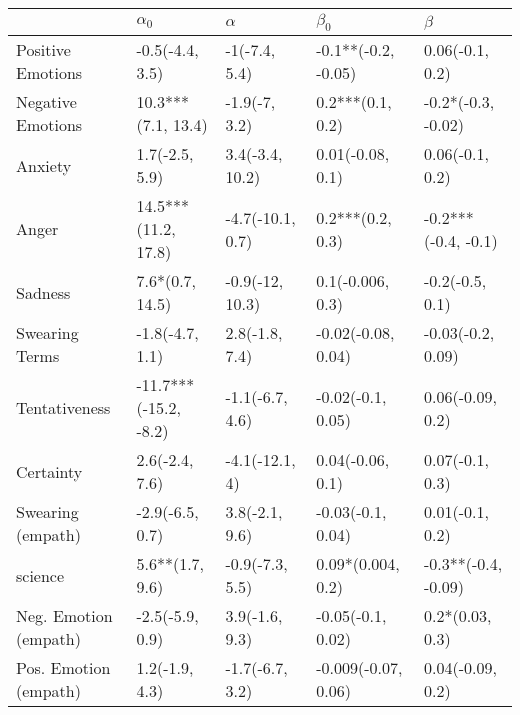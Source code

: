 \begin{tabular}{lllll}
\toprule
{} &             $\alpha_0$ &          $\alpha$ &            $\beta_0$ &              $\beta$ \\
\midrule
Positive Emotions     &        -0.5(-4.4, 3.5) &     -1(-7.4, 5.4) &  -0.1**(-0.2, -0.05) &      0.06(-0.1, 0.2) \\
Negative Emotions     &     10.3***(7.1, 13.4) &     -1.9(-7, 3.2) &     0.2***(0.1, 0.2) &   -0.2*(-0.3, -0.02) \\
Anxiety               &         1.7(-2.5, 5.9) &   3.4(-3.4, 10.2) &     0.01(-0.08, 0.1) &      0.06(-0.1, 0.2) \\
Anger                 &    14.5***(11.2, 17.8) &  -4.7(-10.1, 0.7) &     0.2***(0.2, 0.3) &  -0.2***(-0.4, -0.1) \\
Sadness               &        7.6*(0.7, 14.5) &   -0.9(-12, 10.3) &     0.1(-0.006, 0.3) &      -0.2(-0.5, 0.1) \\
Swearing Terms        &        -1.8(-4.7, 1.1) &    2.8(-1.8, 7.4) &   -0.02(-0.08, 0.04) &    -0.03(-0.2, 0.09) \\
Tentativeness         &  -11.7***(-15.2, -8.2) &   -1.1(-6.7, 4.6) &    -0.02(-0.1, 0.05) &     0.06(-0.09, 0.2) \\
Certainty             &         2.6(-2.4, 7.6) &    -4.1(-12.1, 4) &     0.04(-0.06, 0.1) &      0.07(-0.1, 0.3) \\
Swearing (empath)     &        -2.9(-6.5, 0.7) &    3.8(-2.1, 9.6) &    -0.03(-0.1, 0.04) &      0.01(-0.1, 0.2) \\
science               &        5.6**(1.7, 9.6) &   -0.9(-7.3, 5.5) &    0.09*(0.004, 0.2) &  -0.3**(-0.4, -0.09) \\
Neg. Emotion (empath) &        -2.5(-5.9, 0.9) &    3.9(-1.6, 9.3) &    -0.05(-0.1, 0.02) &      0.2*(0.03, 0.3) \\
Pos. Emotion (empath) &         1.2(-1.9, 4.3) &   -1.7(-6.7, 3.2) &  -0.009(-0.07, 0.06) &     0.04(-0.09, 0.2) \\
\bottomrule
\end{tabular}
